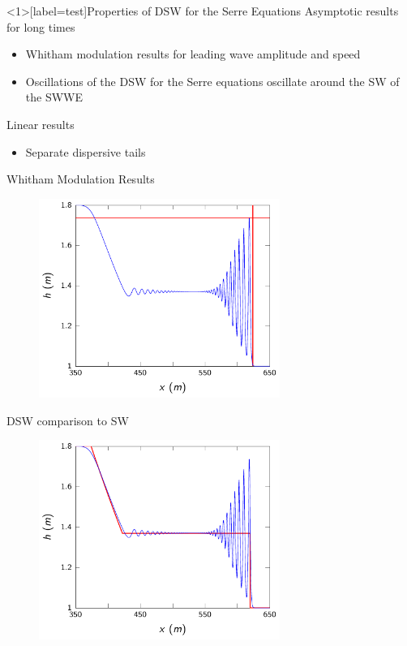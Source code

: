 \documentclass[pdf]{beamer}
\begin{document}
\begin{frame}<1>[label=test]{Properties of DSW for the Serre Equations}
	Asymptotic results for long times
	\begin{itemize}
		\item Whitham modulation results for leading wave amplitude and speed \pause
		\item Oscillations of the DSW for the Serre equations oscillate around the SW of the SWWE \newline 
		\pause
	\end{itemize}
	Linear results
		\begin{itemize}
			\item Separate dispersive tails
		\end{itemize}
\end{frame}

\begin{frame}{Whitham Modulation Results}
	\begin{figure}
		\includegraphics[width=0.7\textwidth]{./Pictures/DSW/DSWap.pdf}
	\end{figure}
\end{frame}


\begin{frame}{DSW comparison to SW}
	\begin{figure}
		\includegraphics[width=0.7\textwidth]{./Pictures/DSW/DSWcompSW.pdf}
	\end{figure}
\end{frame}
\end{document}
